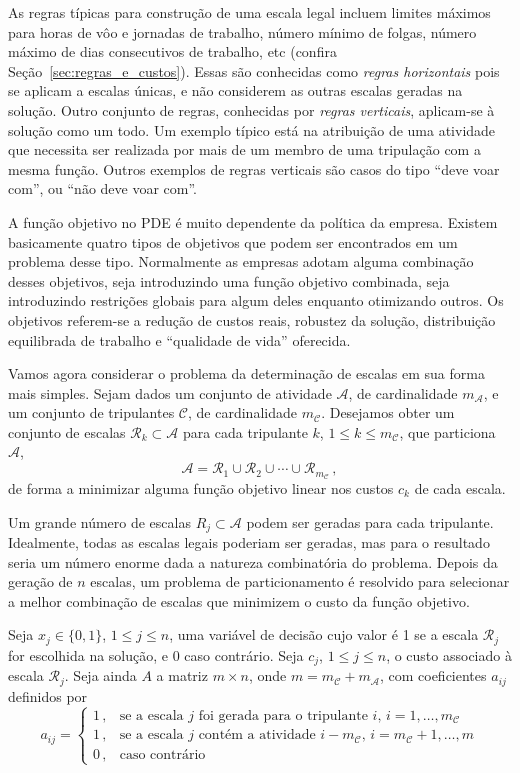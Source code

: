 \documentclass[12pt,a4paper]{article}
\newcommand{\ev}{\, ,}                                       %
\newcommand{\calA}{\mathcal{A}}
\newcommand{\calC}{\mathcal{C}}
\newcommand{\calR}{\mathcal{R}}
\begin{document}
As regras típicas para construção de uma escala legal incluem limites máximos para horas de vôo
e jornadas de trabalho, número mínimo de folgas, número máximo de dias consecutivos de trabalho, etc 
(confira Seção~\ref{sec:regras_e_custos}). Essas são conhecidas como \emph{regras horizontais} pois
se aplicam a escalas únicas, e não considerem as outras escalas geradas na solução. Outro conjunto 
de regras, conhecidas por \emph{regras verticais}, aplicam-se à solução como um todo. Um exemplo
típico está na atribuição de uma atividade que necessita ser realizada por mais de um membro de uma tripulação com a mesma função. Outros exemplos de regras verticais são casos do tipo 
``deve voar com'', ou ``não deve voar com''.
 
A função objetivo no PDE é muito dependente da política da empresa. Existem basicamente quatro 
tipos de objetivos que podem ser encontrados em um problema desse tipo. Normalmente as empresas
adotam alguma combinação desses objetivos, seja introduzindo uma função objetivo combinada, seja
introduzindo restrições globais para algum deles enquanto otimizando outros. Os objetivos referem-se
a redução de custos reais, robustez da solução, distribuição equilibrada de trabalho e ``qualidade
de vida'' oferecida.

Vamos agora considerar o problema da determinação de escalas em sua forma mais simples. Sejam dados
um conjunto de atividade $\calA$, de cardinalidade $m_\calA$, e um conjunto de tripulantes $\calC$,
de cardinalidade $m_\calC$. Desejamos obter um conjunto de escalas $\calR_k \subset \calA$ para cada
tripulante $k$, $1 \leq k \leq m_\calC$, que particiona $\calA$,
%
\begin{equation*}
	\calA = \calR_1 \cup \calR_2 \cup \cdots \cup \calR_{m_\calC} \ev
\end{equation*}
%
de forma a minimizar alguma função objetivo linear nos custos $c_k$ de cada escala.

Um grande número de escalas $R_j \subset \calA$ podem ser geradas para cada tripulante. Idealmente,
todas as escalas legais poderiam ser geradas, mas para o resultado seria um número enorme dada a 
natureza combinatória do problema. Depois da geração de $n$ escalas, um problema de particionamento 
é resolvido para selecionar a melhor combinação de escalas que minimizem o custo da função objetivo.

Seja $x_j \in \{0, 1\}$, $1 \leq j \leq n$, uma variável de decisão cujo valor é 1 se a escala
$\calR_j$ for escolhida na solução, e 0 caso contrário. Seja $c_j$, $1 \leq j \leq n$, o custo 
associado à escala $\calR_j$. Seja ainda $A$ a matriz $m \times n$, onde $m = m_\calC + m_\calA$, 
com coeficientes $a_{ij}$ definidos por
%
\begin{equation*}
	a_{ij} = \left\{
	\begin{array}{ll}
			1 \ev & \text{se a escala $j$ foi gerada para o tripulante $i$, $i = 1, \ldots, m_\calC$} \\
			1 \ev & \text{se a escala $j$ contém a atividade $i - m_\calC$, 
			$i = m_\calC + 1, \ldots, m$} \\
			0 \ev & \text{caso contrário}
	\end{array}
	\right.
\end{equation*}
\end{document}
